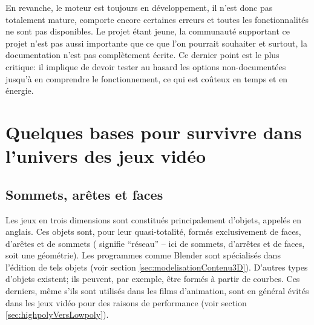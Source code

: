 En revanche, le moteur est toujours en développement, il n'est donc pas totalement mature, comporte encore certaines erreurs et toutes les fonctionnalités ne sont pas disponibles. Le projet étant jeune, la communauté supportant ce projet n'est pas aussi importante que ce que l'on pourrait souhaiter et surtout, la documentation n'est pas complètement écrite. Ce dernier point est le plus critique: il implique de devoir tester au hasard les options non-documentées jusqu'à en comprendre le fonctionnement, ce qui est coûteux en temps et en énergie.




\section{Quelques bases pour survivre dans l'univers des jeux vidéo}


\subsection{Sommets, arêtes et faces}
Les jeux en trois dimensions sont constitués principalement d'objets, appelés  en anglais. Ces objets sont, pour leur quasi-totalité, formés exclusivement de faces, d'arêtes et de sommets ( signifie \enquote{réseau} -- ici de sommets, d'arrêtes et de faces, soit une géométrie). Les programmes comme Blender sont spécialisés dans l'édition de tels objets (voir section \ref{sec:modelisationContenu3D}). D'autres types d'objets existent; ils peuvent, par exemple, être formés à partir de courbes. Ces derniers, même s'ils sont utilisés dans les films d'animation, sont en général évités dans les jeux vidéo pour des raisons de performance (voir section \ref{sec:highpolyVersLowpoly}).



